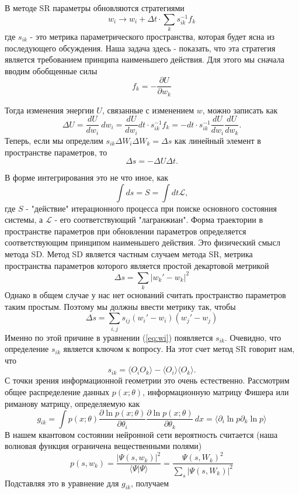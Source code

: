     В методе SR параметры обновляются стратегиями
    \begin{equation} \label{eq:wi}
        w_i \rightarrow w_i + \Delta t \cdot \sum_k  s_{ik}^{-1} f_k
    \end{equation}
    где $s_{ik}$ - это метрика параметрического пространства, которая будет ясна из последующего обсуждения. Наша задача здесь - показать, что эта стратегия является требованием принципа наименьшего действия. Для этого мы сначала вводим обобщенные силы
    \[
    f_k = -\frac{\partial U}{\partial w_k}
    \]
    

    Тогда изменения энергии $U$, связанные с изменением $w$, можно записать как
    \[
    \Delta U = \frac{dU}{dw_i} \ dw_i = \frac{dU}{dw_i} dt \cdot s_{ik}^{-1} f_k = - dt \cdot s_{ik}^{-1} \frac{dU}{dw_i} \frac{dU}{dw_k}.
    \]
    Теперь, если мы определим $s_{ik} \Delta W_i \Delta W_k = \Delta s$ как линейный элемент в пространстве параметров, то
    \[
    \Delta s = -{\Delta U}{\Delta t}.
    \]
    
    В форме интегрирования это не что иное, как
    \[
    \int ds = S = \int dt \mathcal{L},
    \]
    где $S$ - "действие" итерационного процесса при поиске основного состояния системы, а $\mathcal{L}$ - его соответствующий "лагранжиан". Форма траектории в пространстве параметров при обновлении параметров определяется соответствующим принципом наименьшего действия. Это физический смысл метода SD. Метод SD является частным случаем метода SR, метрика пространства параметров которого является простой декартовой метрикой
    \[
    \Delta s = \sum_k |w_k' - w_k|^2
    \]
    Однако в общем случае у нас нет оснований считать пространство параметров таким простым. Поэтому мы должны ввести метрику так, чтобы
    \[
    \Delta s = \sum_{i,j} s_{ij}(w_i' - w_i)(w_j' - w_j)
    \]
    Именно по этой причине в уравнении (\ref{eq:wi}) появляется $s_{ik}$.
    Очевидно, что определение $s_{ik}$ является ключом к вопросу. На этот счет метод SR говорит нам, что
    \begin{equation} \label{eq:sik}
    s_{ik} = \langle O_i O_k \rangle - \langle O_i \rangle \langle O_k \rangle.
    \end{equation}
    С точки зрения информационной геометрии это очень естественно. Рассмотрим общее распределение данных $p(x; \theta)$, информационную матрицу Фишера или риманову матрицу, определяемую как
    \[
    g_{ik} = \int p(x; \theta) \frac{\partial \ln p(x; \theta)}{\partial \theta_i} \frac{\partial \ln p(x; \theta)}{\partial \theta_k} \, dx = \langle \partial_i \ln p \partial_k \ln p \rangle 
    \]
    В нашем квантовом состоянии нейронной сети вероятность считается (наша волновая функция ограничена вещественными полями)
    \[
    p(s, w_k) = \frac{|\Psi(s, w_k)|^2}{\langle \Psi | \Psi \rangle} = \frac{\Psi(s, W_k)^2}{\sum_s |\Psi(s, W_k)|^2}
    \]
    Подставляя это в уравнение для $g_{ik}$, получаем
    
